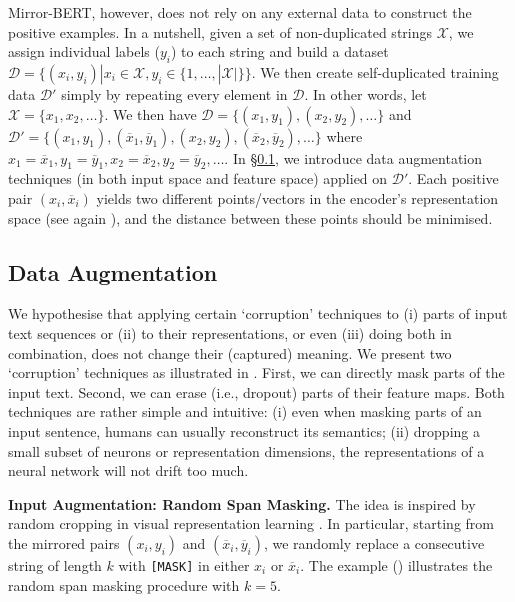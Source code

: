 \documentclass[11pt]{article}
\begin{document}
Mirror-BERT, however, does not rely on any external data to construct the positive examples. In a nutshell, given a set of non-duplicated strings $\mathcal{X}$, we assign individual labels ($y_i$) to each string and build a dataset $\mathcal{D}=\{(x_i, y_i) |x_i\in\mathcal{X}, y_i \in\{1,\ldots,|\mathcal{X}|\}\}$. We then create self-duplicated training data $\mathcal{D'}$ simply by repeating every element in $\mathcal{D}$.  
In other words, let $\mathcal{X} = \{x_1, x_2, \ldots\}$. We then have $\mathcal{D} = \{(x_1, y_1), (x_2, y_2), \ldots\}$ and $\mathcal{D'} = \{(x_1, y_1), (\overline{x}_1, \overline{y}_1), (x_2, y_2), (\overline{x}_2, \overline{y}_2), \ldots\}$ where $x_1 = \overline{x}_1, y_1 = \overline{y}_1, x_2 = \overline{x}_2, y_2 = \overline{y}_2, \ldots$. In \S\ref{sec:data_aug}, we introduce data augmentation techniques (in both input space and feature space) applied on $\mathcal{D'}$. Each positive pair $(x_i,\overline{x}_i)$ yields two different points/vectors in the encoder's representation space (see again ), and the distance between these points should be minimised.

\subsection{Data Augmentation}\label{sec:data_aug}
We hypothesise that applying certain `corruption' techniques to (i) parts of input text sequences or (ii) to their representations, or even (iii) doing both in combination, does not change their (captured) meaning. We present two `corruption' techniques as illustrated in . First, we can directly mask parts of the input text. Second, we can erase (i.e., dropout) parts of their feature maps. Both techniques are rather simple and intuitive: (i) even when masking parts of an input sentence, humans can usually reconstruct its semantics; (ii) dropping a small subset of neurons or representation dimensions, the representations of a neural network will not drift too much.





\vspace{1.5mm}
\noindent \textbf{Input Augmentation: Random Span Masking.} The idea is inspired by random cropping in visual representation learning \cite{Hendrycks:2020augmix}. In particular, starting from the mirrored pairs $(x_i, y_i)$ and $(\overline{x}_i, \overline{y}_i)$, we randomly replace a consecutive string of length $k$ with \texttt{[MASK]} in either $x_i$ or $\overline{x}_i$. The example () illustrates the random span masking procedure with $k=5$.
\end{document}
